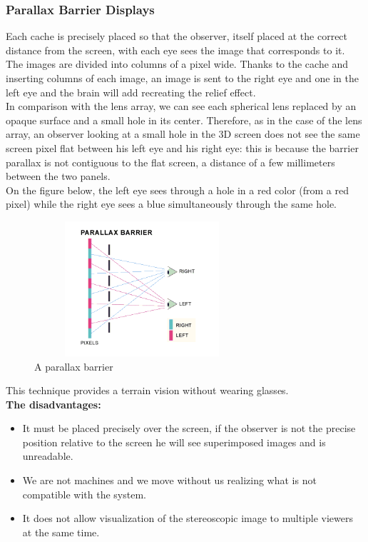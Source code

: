 \subsubsection{Parallax Barrier Displays}

Each cache is precisely placed so that the observer, itself placed at the correct distance from the screen, with each eye sees the image that corresponds to it. The images are divided into columns of a pixel wide. Thanks to the cache and inserting columns of each image, an image is sent to the right eye and one in the left eye and the brain will add recreating the relief effect.\\
In comparison with the lens array, we can see each spherical lens replaced by an opaque surface and a small hole in its center. Therefore, as in the case of the lens array, an observer looking at a small hole in the 3D screen does not see the same screen pixel flat between his left eye and his right eye: this is because the barrier parallax is not contiguous to the flat screen, a distance of a few millimeters between the two panels.\\
On the figure below, the left eye sees through a hole in a red color (from a red pixel) while the right eye sees a blue simultaneously through the same hole.
\clearpage

\begin{figure}[h!]
\begin{center}
\begin{minipage}{1\linewidth}
\centering\includegraphics[width=8cm,height=5cm]{image/parallax.png}
\caption{A parallax barrier\cite{glasses-free3D}}
\end{minipage}
\end{center}
\end{figure}

This technique provides a terrain vision without wearing glasses.\\

\textbf{The disadvantages:}
\begin{itemize}
\item It must be placed precisely over the screen, if the observer is not the precise position relative to the screen he will see superimposed images and is unreadable.
\item We are not machines and we move without us realizing what is not compatible with the system.
\item It does not allow visualization of the stereoscopic image to multiple viewers at the same time.
\end{itemize}

